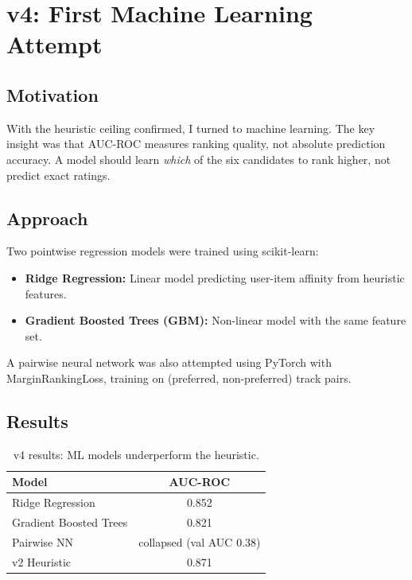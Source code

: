 \documentclass[12pt]{article}
\begin{document}
\newpage
\section{v4: First Machine Learning Attempt}

\subsection{Motivation}

With the heuristic ceiling confirmed, I turned to machine learning. The key insight was that AUC-ROC measures ranking quality, not absolute prediction accuracy. A model should learn \emph{which} of the six candidates to rank higher, not predict exact ratings.

\subsection{Approach}

Two pointwise regression models were trained using scikit-learn:

\begin{itemize}
	\item \textbf{Ridge Regression:} Linear model predicting user-item affinity from heuristic features.
	\item \textbf{Gradient Boosted Trees (GBM):} Non-linear model with the same feature set.
\end{itemize}

A pairwise neural network was also attempted using PyTorch with MarginRankingLoss, training on (preferred, non-preferred) track pairs.

\subsection{Results}

\begin{table}[H]
	\centering
	\begin{tabular}{lc}
		\toprule
		\textbf{Model} & \textbf{AUC-ROC} \\
		\midrule
		Ridge Regression    & 0.852 \\
		Gradient Boosted Trees & 0.821 \\
		Pairwise NN         & collapsed (val AUC 0.38) \\
		\midrule
		v2 Heuristic        & 0.871 \\
		\bottomrule
	\end{tabular}
	\caption{v4 results: ML models underperform the heuristic.}\label{tab:v4}
\end{table}
\end{document}
